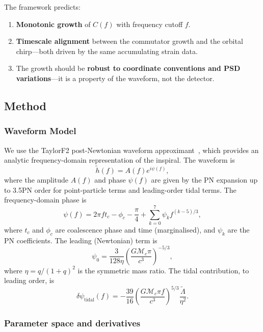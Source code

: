 \documentclass[twocolumn,prd,showpacs,superscriptaddress]{revtex4-2}
\newcommand{\Mchirp}{\mathcal{M}_c}
\newcommand{\Lambdatilde}{\tilde{\Lambda}}
\begin{document}
The framework predicts:
\begin{enumerate}
\item \textbf{Monotonic growth} of $C(f)$ with frequency cutoff $f$.
\item \textbf{Timescale alignment} between the commutator growth and the orbital chirp---both driven by the same accumulating strain data.
\item The growth should be \textbf{robust to coordinate conventions and PSD variations}---it is a property of the waveform, not the detector.
\end{enumerate}

\subsection{Method}

\subsubsection{Waveform Model}

We use the TaylorF2 post-Newtonian waveform approximant~\cite{buonanno2009gw}, which provides an analytic frequency-domain representation of the inspiral. The waveform is
\begin{equation}
\tilde{h}(f) = A(f) e^{i\psi(f)},
\label{eq:waveform}
\end{equation}
where the amplitude $A(f)$ and phase $\psi(f)$ are given by the PN expansion up to 3.5PN order for point-particle terms and leading-order tidal terms. The frequency-domain phase is
\begin{equation}
\psi(f) = 2\pi f t_c - \phi_c - \frac{\pi}{4} + \sum_{k=0}^{7} \psi_k f^{(k-5)/3},
\label{eq:phase}
\end{equation}
where $t_c$ and $\phi_c$ are coalescence phase and time (marginalised), and $\psi_k$ are the PN coefficients. The leading (Newtonian) term is
\begin{equation}
\psi_0 = \frac{3}{128 \eta} \left(\frac{G\Mchirp \pi}{c^3}\right)^{-5/3},
\label{eq:newtonian_phase}
\end{equation}
where $\eta = q/(1+q)^2$ is the symmetric mass ratio. The tidal contribution, to leading order, is
\begin{equation}
\delta\psi_{\text{tidal}}(f) = -\frac{39}{16} \left(\frac{G\Mchirp \pi f}{c^3}\right)^{5/3} \frac{\Lambdatilde}{\eta^2}.
\label{eq:tidal_phase}
\end{equation}

\subsubsection{Parameter space and derivatives}
\end{document}
